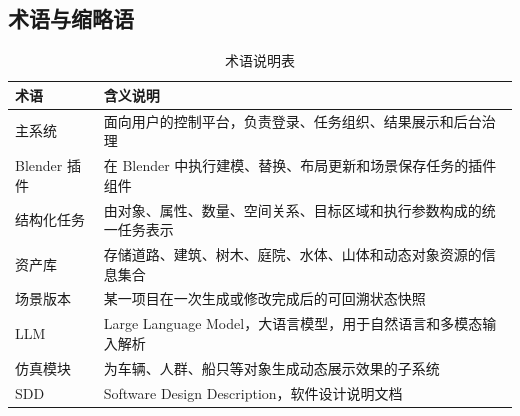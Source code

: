 \subsection{术语与缩略语}
\begin{table}[H]
\centering
\caption{术语说明表}
\begin{tabularx}{\textwidth}{p{3cm} Y}
\toprule
术语 & 含义说明 \\
\midrule
主系统 & 面向用户的控制平台，负责登录、任务组织、结果展示和后台治理 \\
Blender 插件 & 在 Blender 中执行建模、替换、布局更新和场景保存任务的插件组件 \\
结构化任务 & 由对象、属性、数量、空间关系、目标区域和执行参数构成的统一任务表示 \\
资产库 & 存储道路、建筑、树木、庭院、水体、山体和动态对象资源的信息集合 \\
场景版本 & 某一项目在一次生成或修改完成后的可回溯状态快照 \\
LLM & Large Language Model，大语言模型，用于自然语言和多模态输入解析 \\
仿真模块 & 为车辆、人群、船只等对象生成动态展示效果的子系统 \\
SDD & Software Design Description，软件设计说明文档 \\
\bottomrule
\end{tabularx}
\end{table}
